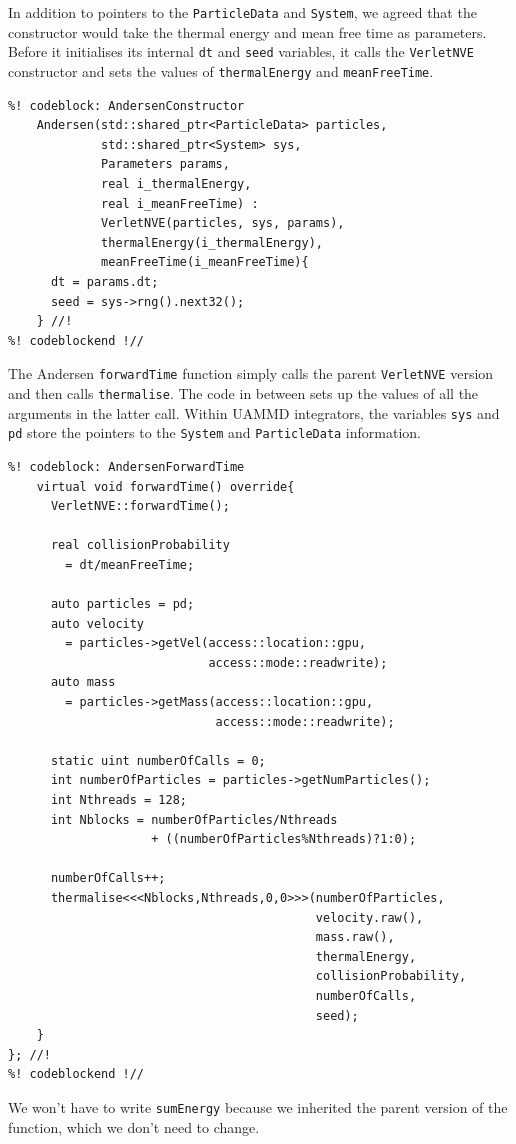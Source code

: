 In addition to pointers to the \texttt{ParticleData} and \texttt{System}, we 
agreed that the constructor would take the thermal energy and mean free time as 
parameters. Before it initialises its internal \texttt{dt} and \texttt{seed} 
variables, it calls the \texttt{VerletNVE} constructor and sets the values of
\texttt{thermalEnergy} and \texttt{meanFreeTime}.
\begin{lstlisting}
%! codeblock: AndersenConstructor
    Andersen(std::shared_ptr<ParticleData> particles,
             std::shared_ptr<System> sys,
             Parameters params,
             real i_thermalEnergy,
             real i_meanFreeTime) :
             VerletNVE(particles, sys, params),
             thermalEnergy(i_thermalEnergy),
             meanFreeTime(i_meanFreeTime){
      dt = params.dt;
      seed = sys->rng().next32();
    } //!
%! codeblockend !//
\end{lstlisting}

The Andersen \texttt{forwardTime} function simply calls the parent 
\texttt{VerletNVE} version and then calls \texttt{thermalise}. The code in 
between sets up the values of all the arguments in the latter call. Within UAMMD
integrators, the variables \texttt{sys} and \texttt{pd} store the pointers to 
the \texttt{System} and \texttt{ParticleData} information.
\begin{lstlisting}
%! codeblock: AndersenForwardTime
    virtual void forwardTime() override{
      VerletNVE::forwardTime();

      real collisionProbability
        = dt/meanFreeTime;

      auto particles = pd;
      auto velocity
        = particles->getVel(access::location::gpu,
                            access::mode::readwrite);
      auto mass
        = particles->getMass(access::location::gpu,
                             access::mode::readwrite);

      static uint numberOfCalls = 0;
      int numberOfParticles = particles->getNumParticles();
      int Nthreads = 128;
      int Nblocks = numberOfParticles/Nthreads
                    + ((numberOfParticles%Nthreads)?1:0);

      numberOfCalls++;
      thermalise<<<Nblocks,Nthreads,0,0>>>(numberOfParticles,
                                           velocity.raw(),
                                           mass.raw(),
                                           thermalEnergy,
                                           collisionProbability,
                                           numberOfCalls,
                                           seed);
    }
}; //!
%! codeblockend !//
\end{lstlisting}
We won't have to write \texttt{sumEnergy} because we inherited the parent 
version of the function, which we don't need to change.

